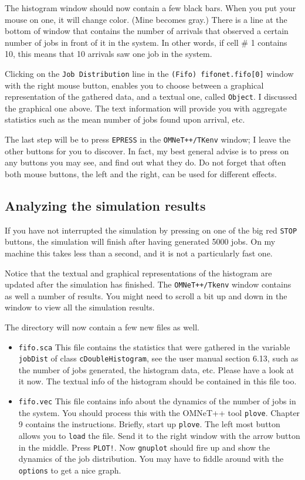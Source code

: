 \documentclass[a4paper]{article}
\begin{document}
The histogram window should now contain a few black bars. When you put
your mouse on one, it will change color. (Mine becomes gray.) There is
a line at the bottom of window that contains the number of arrivals
that observed a certain number of jobs in front of it in the system.
In other words, if cell \# 1 contains 10, this means that 10 arrivals
saw one job in the system.

Clicking on the \texttt{Job Distribution} line in the
\texttt{(Fifo) fifonet.fifo[0]} window with the right mouse button, enables
you to choose between a graphical representation of the gathered data,
and a textual one, called \texttt{Object}. I discussed the graphical
one above. The text information will provide you with aggregate statistics
such as the mean number of jobs found upon arrival, etc.

The last step will be to press \texttt{EPRESS} in the
\texttt{OMNeT++/TKenv} window; I leave the other
buttons for you to discover. In fact, my best general advise is to
press on any buttons you may see, and find out what they do. Do not
forget that often both mouse buttons, the left and the right, can be
used for different effects.


\subsection{Analyzing the simulation results}
\label{sec:interpreting-results}
If you have not interrupted the simulation by pressing on one of the
big red \texttt{STOP} buttons, the simulation will finish
after having generated 5000 jobs. On my machine this takes less than a
second, and it is not a particularly fast one.

Notice that the textual and graphical representations of the histogram
are updated after the simulation has finished. The
\texttt{OMNeT++/Tkenv} window contains as well a number of results.
You might need to scroll a bit up and down in the window to view all
the simulation results.

The directory will now contain a few new files as well.
\begin{itemize}
\item \texttt{fifo.sca} This file contains the statistics that were
  gathered in the variable \texttt{jobDist} of class
  \texttt{cDoubleHistogram}, see the user manual section 6.13, such as
  the number of jobs generated, the histogram data, etc. Please have a
  look at it now.  The textual info of the histogram should be
  contained in this file too.
\item \texttt{fifo.vec} This file contains info about the dynamics of
  the number of jobs in the system. You should process this with the
  OMNeT++ tool \texttt{plove}. Chapter 9 contains the instructions.
  Briefly, start up \texttt{plove}. The left most button allows you to
  \texttt{load} the file. Send it to the right window with the arrow
  button in the middle. Press \texttt{PLOT!}. Now \texttt{gnuplot}
  should fire up and show the dynamics of the job distribution. You
  may have to fiddle around with the \texttt{options} to get a nice
  graph.
\end{itemize}
\end{document}
